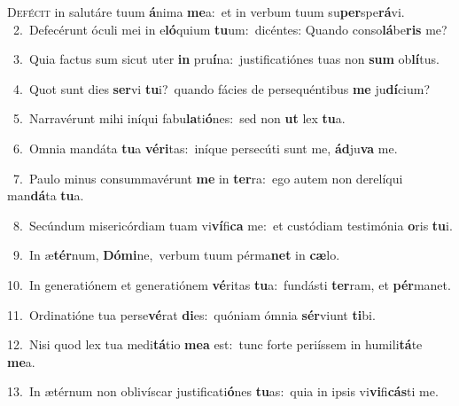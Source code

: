 \lettrine{\initial\textcolor{\initialcolor}{D}}{efécit} in salutáre tuum \textbf{á}\-nima \textbf{me}\-a:~\star et in verbum tuum su\-\textbf{per}\-spe\-\textbf{rá}\-vi.\\
{\numbfont\textcolor{\numbcolor}{~2.}}~Defecérunt óculi mei in e\-\textbf{ló}\-quium \textbf{tu}\-um:~\star dicéntes: Quando conso\-\textbf{lá}\-be\textbf{ris} me?\par
{\numbfont\textcolor{\numbcolor}{~3.}}~Quia factus sum sicut uter \textbf{in} pru\-\textbf{í}\-na:~\star justificatiónes tuas non \textbf{sum} ob\-\textbf{lí}\-tus.\par
{\numbfont\textcolor{\numbcolor}{~4.}}~Quot sunt dies \textbf{ser}\-vi \textbf{tu}\-i?~\star quando fácies de persequéntibus \textbf{me} ju\-\textbf{dí}\-cium?\par
{\numbfont\textcolor{\numbcolor}{~5.}}~Narravérunt mihi iníqui fabu\-\textbf{la}\-ti\-\textbf{ó}\-nes:~\star sed non \textbf{ut} lex \textbf{tu}\-a.\par
{\numbfont\textcolor{\numbcolor}{~6.}}~Omnia mandáta \textbf{tu}\-a \textbf{vé}\-\textbf{ri}tas:~\star iníque persecúti sunt me, \textbf{ád}\-ju\textbf{va} me.\par
{\numbfont\textcolor{\numbcolor}{~7.}}~Paulo minus consummavérunt \textbf{me} in \textbf{ter}\-ra:~\star ego autem non derelíqui man\-\textbf{dá}\-ta \textbf{tu}\-a.\par
{\numbfont\textcolor{\numbcolor}{~8.}}~Secúndum misericórdiam tuam vi\-\textbf{ví}\-fi\textbf{ca} me:~\star et custódiam testimónia \textbf{o}\-ris \textbf{tu}\-i.\par
{\numbfont\textcolor{\numbcolor}{~9.}}~In æ\-\textbf{tér}\-num, \textbf{Dó}\-\textbf{mi}ne,~\star verbum tuum pérma\textbf{net} in \textbf{cæ}\-lo.\par
{\numbfont\textcolor{\numbcolor}{10.}}~In generatiónem et generatiónem \textbf{vé}\-ritas \textbf{tu}\-a:~\star fundásti \textbf{ter}\-ram, et \textbf{pér}\-manet.\par
{\numbfont\textcolor{\numbcolor}{11.}}~Ordinatióne tua perse\-\textbf{vé}\-rat \textbf{di}\-es:~\star quóniam ómnia \textbf{sér}\-viunt \textbf{ti}\-bi.\par
{\numbfont\textcolor{\numbcolor}{12.}}~Nisi quod lex tua medi\-\textbf{tá}\-tio \textbf{me}\-\textbf{a} est:~\star tunc forte periíssem in humili\-\textbf{tá}\-te \textbf{me}\-a.\par
{\numbfont\textcolor{\numbcolor}{13.}}~In ætérnum non oblivíscar justificati\-\textbf{ó}\-nes \textbf{tu}\-as:~\star quia in ipsis vi\-\textbf{vi}\-fi\-\textbf{cás}\-ti me.\par
